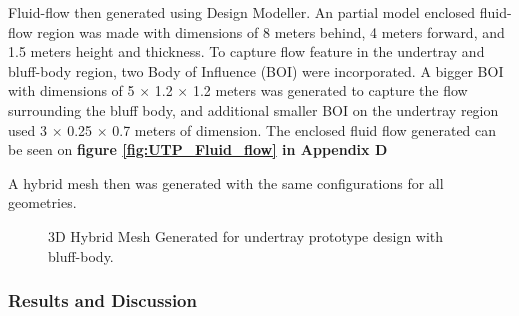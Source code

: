  \noindent Fluid-flow then generated using Design Modeller. An partial model enclosed fluid-flow region was made with dimensions of 8 meters behind, 4 meters forward, and 1.5 meters height and thickness. To capture flow feature in the undertray and bluff-body region, two Body of Influence (BOI) were incorporated. A bigger BOI with dimensions of 5 $\times$ 1.2 $\times$ 1.2 meters was generated to capture the flow surrounding the bluff body, and additional smaller BOI on the undertray region used 3 $\times$ 0.25 $\times$ 0.7 meters of dimension. The enclosed fluid flow generated can be seen on \textbf{figure \ref{fig:UTP_Fluid_flow} in Appendix D}

\noindent A hybrid mesh then was generated with the same configurations for all geometries.

\begin{figure}[!htb] %
    \centering
    \noindent{}
    \caption{3D Hybrid Mesh Generated for undertray prototype design with bluff-body.}\label{fig:3D_UT_MESH}
\end{figure}

\subsubsection{Results and Discussion}




















